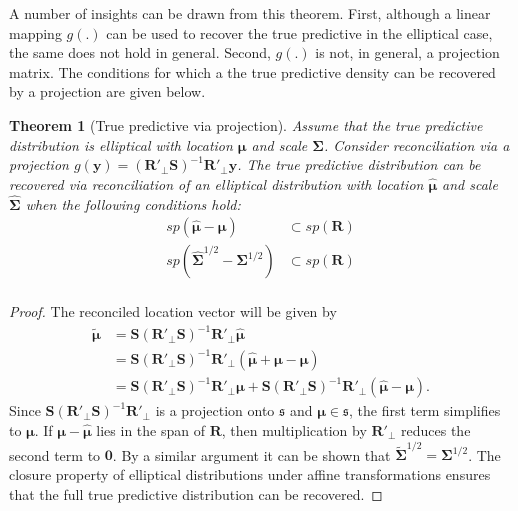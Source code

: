 \documentclass[a4paper, 11pt]{article}
\newtheorem{theo}{Theorem}[section]
\theoremstyle{definition}
\begin{document}
A number of insights can be drawn from this theorem. First, although a linear mapping $g(.)$ can be used to recover the true predictive in the elliptical case, the same does not hold in general. Second, $g(.)$ is not, in general, a projection matrix. The conditions for which a the true predictive density can be recovered by a projection are given below.

\begin{theo}[True predictive via projection]
	Assume that the true predictive distribution is elliptical with location $\bm{\mu}$ and scale $\bm{\Sigma}$. Consider reconciliation via a projection $g(\bm{y})=(\bm{R}'_{\perp}\bm{S})^{-1}\bm{R}'_{\perp}\bm{y}$. The true predictive distribution can be recovered via reconciliation of an elliptical distribution with location $\hat{\bm{\mu}}$ and scale $\hat{\bm{\Sigma}}$  when the following conditions hold:
	\begin{align}
	sp(\hat{\bm\mu}-\bm{\mu})&\subset sp(\bm{R})\\
    sp(\hat{\bm{\Sigma}}^{1/2}-\bm{\Sigma}^{1/2})&\subset sp(\bm{R})\\
	\end{align}
\end{theo}

\begin{proof}
	The reconciled location vector will be given by
	\begin{align*}
		\tilde{\bm{\mu}}&=\bm{S}(\bm{R}'_{\perp}\bm{S})^{-1}\bm{R}'_{\perp}\hat{\bm{\mu}}\\
		&=\bm{S}(\bm{R}'_{\perp}\bm{S})^{-1}\bm{R}'_{\perp}\left(\hat{\bm{\mu}}+\bm{\mu}-\bm{\mu}\right)\\
		&=\bm{S}(\bm{R}'_{\perp}\bm{S})^{-1}\bm{R}'_{\perp}\bm{\mu}+\bm{S}(\bm{R}'_{\perp}\bm{S})^{-1}\bm{R}'_{\perp}\left(\hat{\bm{\mu}}-\bm{\mu}\right).
	\end{align*}
  Since $\bm{S}(\bm{R}'_{\perp}\bm{S})^{-1}\bm{R}'_{\perp}$ is a projection onto $\mathfrak{s}$ and $\bm{\mu}\in\mathfrak{s}$, the first term simplifies to $\bm{\mu}$. If $\bm{\mu}-\hat{\bm{\mu}}$ lies in the span of $\bm{R}$, then multiplication by $\bm{R}'_{\perp}$ reduces the second term to $\bm{0}$. By a similar argument it can be shown that $\tilde{\bm{\Sigma}}^{1/2}=\bm{\Sigma}^{1/2}$. The closure property of elliptical distributions under affine transformations ensures that the full true predictive distribution can be recovered.
\end{proof}
\end{document}

